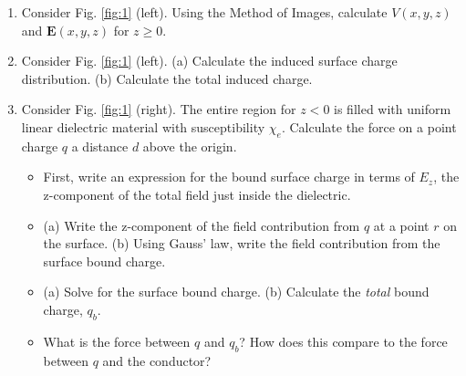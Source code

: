 \documentclass[10pt]{article}
\begin{document}
\begin{enumerate}
\item Consider Fig. \ref{fig:1} (left).  Using the Method of Images, calculate $V(x,y,z)$ and $\mathbf{E}(x,y,z)$ for $z\geq 0$. \\ \vspace{4cm}
\item Consider Fig. \ref{fig:1} (left).  (a) Calculate the induced surface charge distribution. (b) Calculate the total induced charge. \\ \vspace{3.5cm}
\item Consider Fig. \ref{fig:1} (right).  The entire region for $z<0$ is filled with uniform linear dielectric material with susceptibility $\chi_e$.  Calculate the force on a point charge $q$ a distance $d$ above the origin.
\begin{itemize}
\item First, write an expression for the bound surface charge in terms of $E_z$, the z-component of the total field just inside the dielectric. \\ \vspace{2cm}
\item (a) Write the z-component of the field contribution from $q$ at a point $r$ on the surface. (b) Using Gauss' law, write the field contribution from the surface bound charge. \\ \vspace{2cm}
\item (a) Solve for the surface bound charge. (b) Calculate the \textit{total} bound charge, $q_b$. \\ \vspace{2cm}
\item What is the force between $q$ and $q_b$?  How does this compare to the force between $q$ and the conductor?
\end{itemize}
\end{enumerate}
\end{document}
